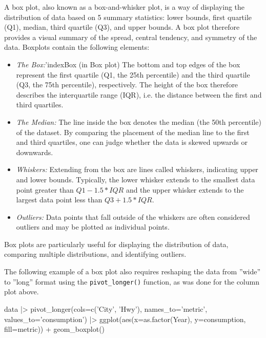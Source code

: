 A box plot, also known as a box-and-whisker plot, is a way of displaying the distribution of data based on 5 summary statistics: lower bounds, first quartile (Q1), median, third quartile (Q3), and upper bounds. A box plot therefore provides a visual summary of the spread, central tendency, and symmetry of the data. Boxplots contain the following elements:

\begin{itemize}
\item \emph{The Box:}'index{Box (in Box plot)} The bottom and top edges of the box represent the first quartile (Q1, the 25th percentile) and the third quartile (Q3, the 75th percentile), respectively. The height of the box therefore describes the interquartile range (IQR), i.e. the distance between the first and third quartiles.
\item \emph{The Median:} The line inside the box denotes the median (the 50th percentile) of the dataset. By comparing the placement of the median line to the first and third quartiles, one can judge whether the data is skewed upwards or downwards.
\item \emph{Whiskers:} Extending from the box are lines called whiskers, indicating upper and lower bounds. Typically, the lower whisker extends to the smallest data point greater than $Q1 - 1.5 * IQR$ and the upper whisker extends to the largest data point less than $Q3 + 1.5 * IQR$.
\item \emph{Outliers:} Data points that fall outside of the whiskers are often considered outliers and may be plotted as individual points.
\end{itemize}

Box plots are particularly useful for displaying the distribution of data, comparing multiple distributions, and identifying outliers.

The following example of a box plot also requires reshaping the data from ''wide'' to ''long'' format using the \texttt{pivot\_longer()} function, as was done for the column plot above.

\begin{Rcode}
data |>
  pivot_longer(cols=c('City', 'Hwy'), 
               names_to='metric', 
               values_to='consumption') |>
  ggplot(aes(x=as.factor(Year), y=consumption, fill=metric)) +
    geom_boxplot()
\end{Rcode}

